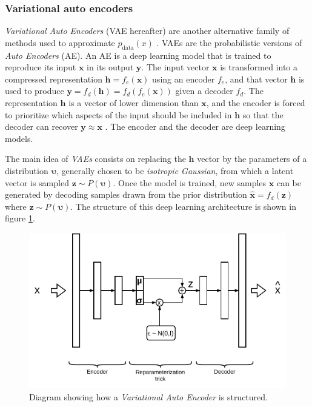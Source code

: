 \subsubsection{Variational auto encoders}
\textit{Variational Auto Encoders} (VAE hereafter) are another alternative family of methods used to approximate $p_\mathrm{data}(x)$ \autocite{kingma2019}. VAEs are the probabilistic versions of \textit{Auto Encoders} (AE). An AE is a deep learning model that is trained to reproduce its input $\mathbf{x}$ in its output $\mathbf{y}$. The input vector $\mathbf{x}$ is transformed into a compressed representation $\mathbf{h}=f_e(\mathbf{x})$ using an encoder $f_e$, and that vector $\mathbf{h}$ is used to produce $\mathbf{y}=f_d(\mathbf{h})=f_d(f_e(\mathbf{x}))$ given a decoder $f_d$. The representation $\mathbf{h}$ is a vector of lower dimension than $\mathbf{x}$, and the encoder is forced to prioritize which aspects of the input should be included in $\mathbf{h}$ so that the decoder can recover $\mathbf{y}\approx \mathbf{x}$ \autocite{Goodfellow2016}. The encoder and the decoder are deep learning models.

The main idea of \textit{VAEs} consists on replacing the $\mathbf{h}$ vector by the parameters of a distribution $\mathbf{\upsilon}$, generally chosen to be \textit{isotropic Gaussian}, from which a latent vector is sampled $\mathbf{z} \sim P(\mathbf{\upsilon})$. Once the model is trained, new samples $\mathbf{\hat{x}}$ can be generated by decoding samples drawn from the prior distribution $\mathbf{\hat{x}} = f_d(\mathbf{z})$ where $\mathbf{z} \sim P(\mathbf{\upsilon})$. The structure of this deep learning architecture is shown in figure \ref{fig:vae}.

\begin{figure}
	\centering
	\includegraphics[width=0.7\linewidth]{chapter2/images/vae}
	\caption{Diagram showing how a \textit{Variational Auto Encoder} is structured. }
	\label{fig:vae}
\end{figure}



